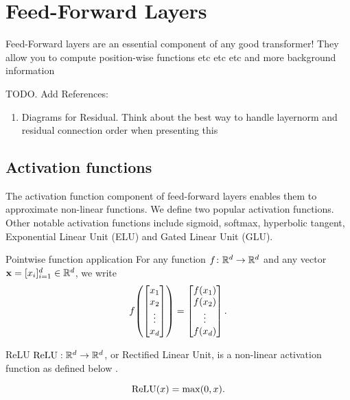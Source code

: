 %
\chapter{Feed-Forward Layers}
%


Feed-Forward layers are an essential component of any good transformer! They allow you to compute position-wise functions etc etc etc and more background information


TODO. Add References:
\begin{enumerate}
    \item Diagrams for Residual. Think about the best way to handle layernorm and residual connection order when presenting this
\end{enumerate}

\section{Activation functions}

The activation function component of feed-forward layers enables them to approximate non-linear functions. We define two popular activation functions. Other notable activation functions include sigmoid, softmax, hyperbolic tangent, Exponential Linear Unit (ELU) and Gated Linear Unit (GLU).

\begin{definition}{Pointwise function application}{}
  For any function $f \colon \mathbb{R}^d \to \mathbb{R}^d$ and any vector $\mathbf{x} = [x_i]_{i=1}^d \in \mathbb{R}^d$, we write
  \begin{equation*}
    f\mleft(\begin{bmatrix} x_1 \\ x_2 \\ \vdots \\ x_d \end{bmatrix}\mright) =  \begin{bmatrix} f(x_1) \\ f(x_2) \\ \vdots \\ f(x_d) \end{bmatrix}.
  \end{equation*}
\end{definition}

\begin{definition}{ReLU}{}
    $\text{ReLU} : \mathbb{R}^d\to \mathbb{R}^d$, or Rectified Linear Unit, is a non-linear activation function as defined below \cite{Fukushima1975}.

    \[\text{ReLU}(x) = \max(0,x).\]
\end{definition}

